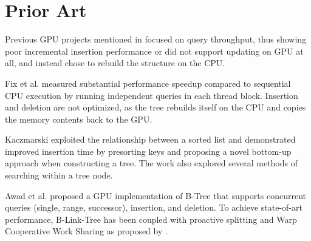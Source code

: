 \section{Prior Art}

Previous GPU projects mentioned in \cite{awad} focused on query throughput, thus showing poor incremental insertion performance or did not support updating on GPU at all, and instead chose to rebuild the structure on the CPU.

Fix et al. \cite{fix2011accelerating} measured substantial performance speedup compared to sequential CPU execution by running independent queries in each thread block. Insertion and deletion are not optimized, as the tree rebuilds itself on the CPU and copies the memory contents back to the GPU.

Kaczmarski \cite{kaczmarski} exploited the relationship between a sorted list and demonstrated improved insertion time by presorting keys and proposing a novel bottom-up approach when constructing a tree. The work also explored several methods of searching within a tree node.

Awad et al. \cite{awad} proposed a GPU implementation of B-Tree that supports concurrent queries (single, range, successor), insertion, and deletion. To achieve state-of-art performance, B-Link-Tree has been coupled with proactive splitting and Warp Cooperative Work Sharing as proposed by \cite{ashkiani2018dynamic}.